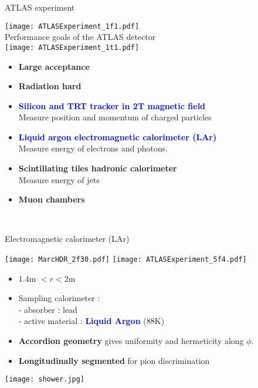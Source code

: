 \begin{frame}{ATLAS experiment}
  \begin{minipage}{0.49\linewidth}
    \texttt{[image: ATLASExperiment\_1f1.pdf]}\\
    Performance goals of the ATLAS detector\\
    \texttt{[image: ATLASExperiment\_1t1.pdf]}
  \end{minipage}
  \hfill
  \begin{minipage}{0.49\linewidth}
    \begin{itemize}
    \item {\bf Large acceptance}
    \item {\bf Radiation hard}
      \newline
    \item \textcolor{blue}{\bf Silicon and TRT tracker in 2T magnetic field}\\
      Measure position and momentum of charged particles
    \item \textcolor{blue}{\bf Liquid argon electromagnetic calorimeter (LAr)} \\
      Measure energy of electrons and photons.
    \item {\bf Scintillating tiles hadronic calorimeter} \\
      Measure energy of jets
    \item {\bf Muon chambers}
    \end{itemize}
  \end{minipage}\\
\end{frame}

\begin{frame}{ Electromagnetic calorimeter (LAr) }
  \begin{minipage}{0.4\linewidth}
    \texttt{[image: MarcHDR\_2f30.pdf]}\newline
    \centering
    \texttt{[image: ATLASExperiment\_5f4.pdf]}
  \end{minipage}
  \hfill
  \begin{minipage}{0.59\linewidth}
    \begin{itemize}
    \item $1.4$m $<r<2$m
    \item Sampling calorimeter : \\
      - absorber : lead\\
      - active material : \textcolor{blue}{\bf Liquid Argon }($88$K)\\
    \item {\bf Accordion geometry} gives uniformity and hermeticity along $\phi$.
    \item {\bf Longitudinally segmented} for pion discrimination
      
    \end{itemize}
    \centering
    \texttt{[image: shower.jpg]}
  \end{minipage}
\end{frame}

